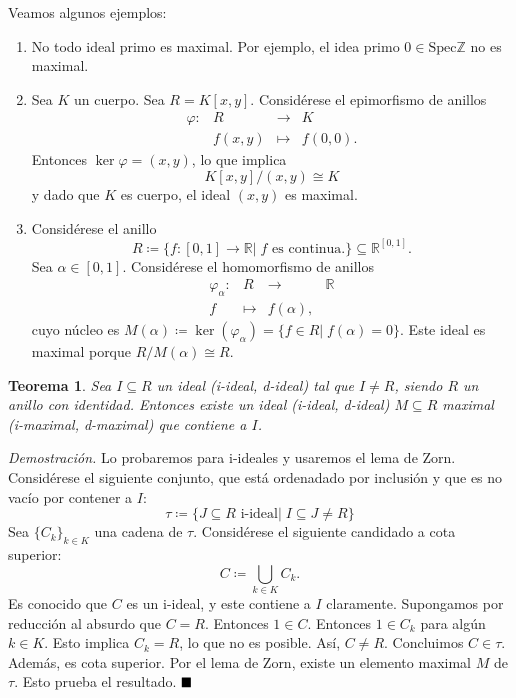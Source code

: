 \documentclass[11pt]{book}
\def\R{\mathbb{R}}
\def\Z{\mathbb{Z}}
\def\Spec{\mathrm{Spec}}
\def\qed{\hfill\blacksquare}
\newtheorem{theorem}{Teorema}[section]
\theoremstyle{definition}
\begin{document}
Veamos algunos ejemplos:\begin{enumerate}
    \item No todo ideal primo es maximal. Por ejemplo, el idea primo $0\in\Spec{\Z}$ no es maximal.
    \item Sea $K$ un cuerpo. Sea $R=K[x,y]$. Considérese el epimorfismo de anillos\[
    \begin{array}{rrcl}
        \varphi:&R&\longrightarrow&K\\
        & f(x,y)&\longmapsto& f(0,0).
    \end{array}
    \]Entonces $\ker\varphi=(x,y)$, lo que implica\[
    K[x,y]/(x,y)\cong K
    \]y dado que $K$ es cuerpo, el ideal $(x,y)$ es maximal.

    \item Considérese el anillo\[
    R\coloneq\{f:[0,1]\longrightarrow\R|\;f\text{ es continua.}\}\subseteq\R^{[0,1]}.
    \]Sea $\alpha\in[0,1]$. Considérese el homomorfismo de anillos\[
    \begin{array}{rrcl}
        \varphi_\alpha:&R&\longrightarrow&\R\\
        f&\longmapsto&f(\alpha),
    \end{array}
    \]cuyo núcleo es $M(\alpha)\coloneq \ker(\varphi_\alpha)=\{f\in R|\; f(\alpha)=0\}$. Este ideal es maximal porque $R/M(\alpha)\cong R$.
\end{enumerate}

\begin{theorem}
    Sea $I\subseteq R$ un ideal (i-ideal, d-ideal) tal que $I\neq R$, siendo $R$ un anillo con identidad. Entonces existe un ideal (i-ideal, d-ideal) $M\subseteq R$ maximal (i-maximal, d-maximal) que contiene a $I$.
\end{theorem}
\noindent\textit{Demostración.} Lo probaremos para i-ideales y usaremos el lema de Zorn. Considérese el siguiente conjunto, que está ordenadado por inclusión y que es no vacío por contener a $I$:\[
\tau\coloneq\{J\subseteq R\text{ i-ideal}|\; I\subseteq J\neq R\}
\]Sea $\{C_k\}_{k\in K}$ una cadena de $\tau$. Considérese el siguiente candidado a cota superior:\[
C\coloneq \bigcup_{k\in K} C_k.
\]Es conocido que $C$ es un i-ideal, y este contiene a $I$ claramente. Supongamos por reducción al absurdo que $C=R$. Entonces $1\in C$. Entonces $1\in C_k$ para algún $k\in K$. Esto implica $C_k=R$, lo que no es posible. Así, $C\neq R$. Concluimos $C\in\tau$. Además, es cota superior. Por el lema de Zorn, existe un elemento maximal $M$ de $\tau$. Esto prueba el resultado. $\qed$
\end{document}
